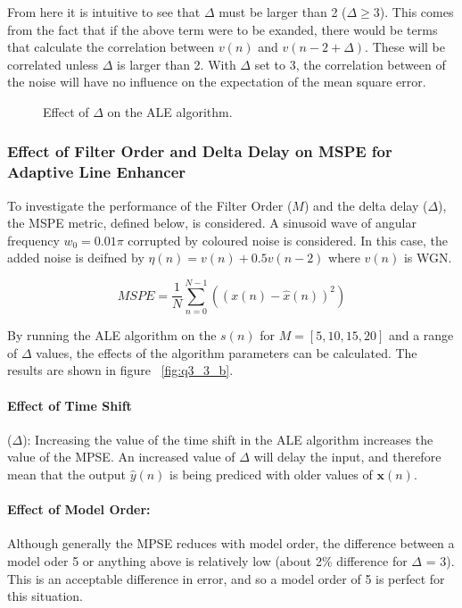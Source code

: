 \documentclass[main.tex]{subfiles}
\begin{document}
From here it is intuitive to see that $\Delta$ must be larger than 2 ($\Delta \ge 3$). This comes from the fact that if the above term were to be exanded, there would be terms that calculate the correlation between $v(n)$ and $v(n-2+\Delta)$. These will be correlated unless $\Delta$ is larger than 2. With $\Delta$ set to 3, the correlation between of the noise will have no influence on the expectation of the mean square error.


\begin{figure}[H]
	\centering 
	\resizebox{0.9\textwidth}{!}{}
	\caption{Effect of $\Delta$ on the ALE algorithm.}
	\label{fig:q3_3_a}
\end{figure}

\subsubsection{Effect of Filter Order and Delta Delay on MSPE for Adaptive Line Enhancer}

To investigate the performance of the Filter Order ($M$) and the delta delay ($\Delta$), the MSPE metric, defined below, is considered. A sinusoid wave of angular frequency $w_0 = 0.01\pi$ corrupted by coloured noise is considered. In this case, the added noise is deifned by $\eta(n) = v(n) + 0.5v(n-2)$ where $v(n)$ is WGN. 

\begin{equation}
	MSPE = \frac{1}{N}\sum_{n=0}^{N-1}((x(n)-\hat{x}(n))^2)
\end{equation}

By running the ALE algorithm on the $s(n)$ for $M=[5,10,15,20]$ and a range of $\Delta$ values, the effects of the algorithm parameters can be calculated. The results are shown in figure ~\ref{fig:q3_3_b}.

\paragraph*{Effect of Time Shift}($\Delta$): Increasing the value of the time shift in the ALE algorithm increases the value of the MPSE. An increased value of $\Delta$ will delay the input, and therefore mean that the output $\hat{y}(n)$ is being prediced with older values of $\textbf{x}(n)$. 

\paragraph*{Effect of Model Order:} Although generally the MPSE reduces with model order, the difference between a model oder 5 or anything above is relatively low (about 2\% difference for $\Delta$ = 3). This is an acceptable difference in error, and so a model order of 5 is perfect for this situation.
\end{document}
